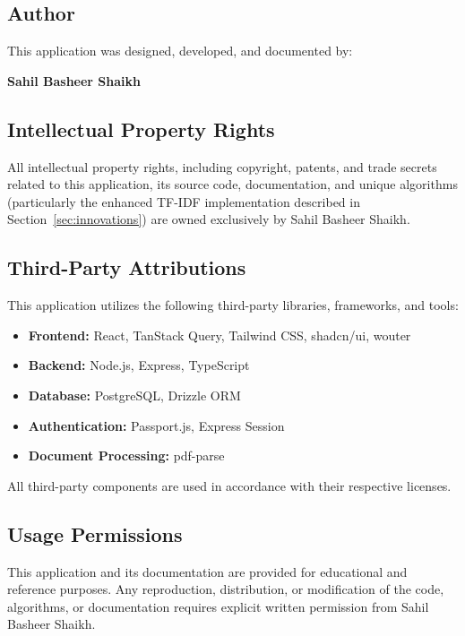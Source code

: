 \documentclass[12pt,a4paper]{article}
\begin{document}
\subsection{Author}

This application was designed, developed, and documented by:

\begin{center}
\textbf{Sahil Basheer Shaikh}
\end{center}

\subsection{Intellectual Property Rights}

All intellectual property rights, including copyright, patents, and trade secrets related to this application, its source code, documentation, and unique algorithms (particularly the enhanced TF-IDF implementation described in Section~\ref{sec:innovations}) are owned exclusively by Sahil Basheer Shaikh.

\subsection{Third-Party Attributions}

This application utilizes the following third-party libraries, frameworks, and tools:

\begin{itemize}
    \item \textbf{Frontend:} React, TanStack Query, Tailwind CSS, shadcn/ui, wouter
    \item \textbf{Backend:} Node.js, Express, TypeScript
    \item \textbf{Database:} PostgreSQL, Drizzle ORM
    \item \textbf{Authentication:} Passport.js, Express Session
    \item \textbf{Document Processing:} pdf-parse
\end{itemize}

All third-party components are used in accordance with their respective licenses.

\subsection{Usage Permissions}

This application and its documentation are provided for educational and reference purposes. Any reproduction, distribution, or modification of the code, algorithms, or documentation requires explicit written permission from Sahil Basheer Shaikh.
\end{document}
